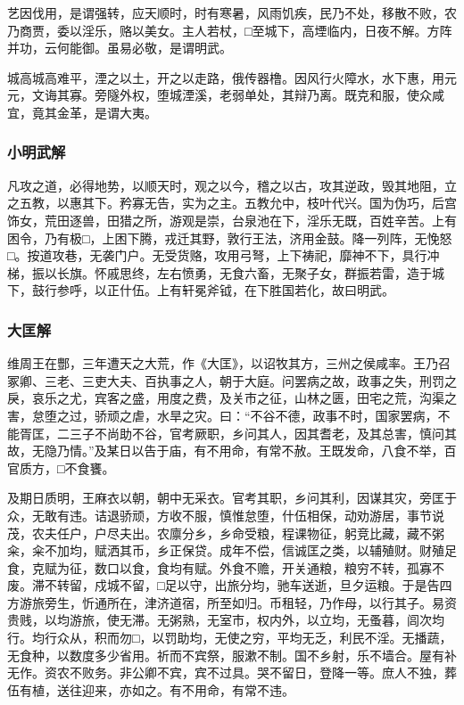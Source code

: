 \documentclass[]{article}
\begin{document}
艺因伐用，是谓强转，应天顺时，时有寒暑，风雨饥疾，民乃不处，移散不败，农乃商贾，委以淫乐，赂以美女。主人若杖，□至城下，高堙临内，日夜不解。方阵并功，云何能御。虽易必敬，是谓明武。

城高城高难平，湮之以土，开之以走路，俄传器橹。因风行火障水，水下惠，用元元，文诲其寡。旁隧外权，堕城湮溪，老弱单处，其辩乃离。既克和服，使众咸宜，竟其金革，是谓大夷。

\hypertarget{header-n85}{%
\subsubsection{小明武解}\label{header-n85}}

凡攻之道，必得地势，以顺天时，观之以今，稽之以古，攻其逆政，毁其地阻，立之五教，以惠其下。矜寡无告，实为之主。五教允中，枝叶代兴。国为伪巧，后宫饰女，荒田逐兽，田猎之所，游观是崇，台泉池在下，淫乐无既，百姓辛苦。上有困令，乃有极□，上困下腾，戎迁其野，敦行王法，济用金鼓。降一列阵，无悗怒□。按道攻巷，无袭门户。无受货赂，攻用弓弩，上下祷祀，靡神不下，具行冲梯，振以长旗。怀戚思终，左右愤勇，无食六畜，无聚子女，群振若雷，造于城下，鼓行参呼，以正什伍。上有轩冕斧钺，在下胜国若化，故曰明武。

\hypertarget{header-n89}{%
\subsubsection{大匡解}\label{header-n89}}

维周王在酆，三年遭天之大荒，作《大匡》，以诏牧其方，三州之侯咸率。王乃召冢卿、三老、三吏大夫、百执事之人，朝于大庭。问罢病之故，政事之失，刑罚之戾，哀乐之尤，宾客之盛，用度之费，及关市之征，山林之匮，田宅之荒，沟渠之害，怠堕之过，骄顽之虐，水旱之灾。曰：``不谷不德，政事不时，国家罢病，不能胥匡，二三子不尚助不谷，官考厥职，乡问其人，因其耆老，及其总害，慎问其故，无隐乃情。''及某日以告于庙，有不用命，有常不赦。王既发命，八食不举，百官质方，□不食饔。

及期日质明，王麻衣以朝，朝中无采衣。官考其职，乡问其利，因谋其灾，旁匡于众，无敢有违。诘退骄顽，方收不服，慎惟怠堕，什伍相保，动劝游居，事节说茂，农夫任户，户尽夫出。农廪分乡，乡命受粮，程课物征，躬竞比藏，藏不粥籴，籴不加均，赋洒其币，乡正保贷。成年不偿，信诚匡之类，以辅殖财。财殖足食，克赋为征，数口以食，食均有赋。外食不赡，开关通粮，粮穷不转，孤寡不废。滞不转留，戍城不留，□足以守，出旅分均，驰车送逝，旦夕运粮。于是告四方游旅旁生，忻通所在，津济道宿，所至如归。币租轻，乃作母，以行其子。易资贵贱，以均游旅，使无滞。无粥熟，无室市，权内外，以立均，无蚤暮，闾次均行。均行众从，积而勿□，以罚助均，无使之穷，平均无乏，利民不淫。无播蔬，无食种，以数度多少省用。祈而不宾祭，服漱不制。国不乡射，乐不墙合。屋有补无作。资农不败务。非公卿不宾，宾不过具。哭不留日，登降一等。庶人不独，葬伍有植，送往迎来，亦如之。有不用命，有常不违。
\end{document}
